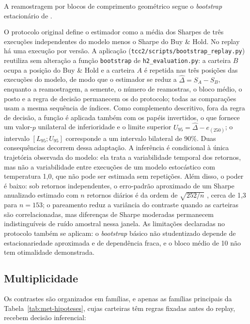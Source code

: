 A reamostragem por blocos de comprimento geométrico segue o \textit{bootstrap} estacionário de \citet{Politis1994}.

O protocolo original define o estimador como a média dos Sharpes de três execuções independentes do modelo menos o Sharpe do Buy \& Hold. No replay há uma execução por versão. A aplicação (\texttt{tcc2/scripts/bootstrap\_replay.py}) reutiliza sem alteração a função \texttt{bootstrap} de \texttt{h2\_evaluation.py}: a carteira $B$ ocupa a posição do Buy \& Hold e a carteira $A$ é repetida nas três posições das execuções do modelo, de modo que o estimador se reduz a $\hat{\Delta} = S_A - S_B$, enquanto a reamostragem, a semente, o número de reamostras, o bloco médio, o posto e a regra de decisão permanecem os do protocolo; todas as comparações usam a mesma sequência de índices. Como complemento descritivo, fora da regra de decisão, a função é aplicada também com os papéis invertidos, o que fornece um valor-$p$ unilateral de inferioridade e o limite superior $U_{95} = \hat{\Delta} - e_{(250)}$; o intervalo $[L_{95}; U_{95}]$ corresponde a um intervalo bilateral de 90\%. Duas consequências decorrem dessa adaptação. A inferência é condicional à única trajetória observada do modelo: ela trata a variabilidade temporal dos retornos, mas não a variabilidade entre execuções de um modelo estocástico com temperatura 1,0, que não pode ser estimada sem repetições. Além disso, o poder é baixo: sob retornos independentes, o erro-padrão aproximado de um Sharpe anualizado estimado com $n$ retornos diários é da ordem de $\sqrt{252/n}$ \citep{Lo2002}, cerca de 1,3 para $n = 153$; o pareamento reduz a variância do contraste quando as carteiras são correlacionadas, mas diferenças de Sharpe moderadas permanecem indistinguíveis de ruído amostral nessa janela. As limitações declaradas no protocolo também se aplicam: o \textit{bootstrap} básico não studentizado depende de estacionariedade aproximada e de dependência fraca, e o bloco médio de 10 não tem otimalidade demonstrada.

\subsection{Multiplicidade}

Os contrastes são organizados em famílias, e apenas as famílias principais da Tabela~\ref{tab:met-hipoteses}, cujas carteiras têm regras fixadas antes do replay, recebem decisão inferencial:

